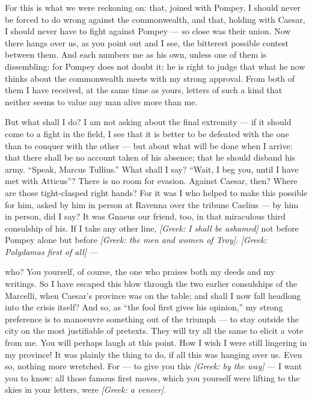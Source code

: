  For this is what we were reckoning on: that, joined with Pompey, I should never be forced to do wrong against the commonwealth, and that, holding with Caesar, I should never have to fight against Pompey --- so close was their union. Now there hangs over us, as you point out and I see, the bitterest possible contest between them. And each numbers me as his own, unless one of them is dissembling: for Pompey does not doubt it; he is right to judge that what he now thinks about the commonwealth meets with my strong approval. From both of them I have received, at the same time as yours, letters of such a kind that neither seems to value any man alive more than me.

 But what shall I do? I am not asking about the final extremity --- if it should come to a fight in the field, I see that it is better to be defeated with the one than to conquer with the other --- but about what will be done when I arrive: that there shall be no account taken of his absence; that he should disband his army. ``Speak, Marcus Tullius.'' What shall I say? ``Wait, I beg you, until I have met with Atticus''? There is no room for evasion. Against Caesar, then? Where are those tight-clasped right hands? For it was I who helped to make this possible for him, asked by him in person at Ravenna over the tribune Caelius --- by him in person, did I say? It was Gnaeus our friend, too, in that miraculous third consulship of his. If I take any other line, \textit{[Greek: I shall be ashamed]} not before Pompey alone but before \textit{[Greek: the men and women of Troy]}. \textit{[Greek: Polydamas first of all]} ---

 who? You yourself, of course, the one who praises both my deeds and my writings. So I have escaped this blow through the two earlier consulships of the Marcelli, when Caesar's province was on the table; and shall I now fall headlong into the crisis itself? And so, as ``the fool first gives his opinion,'' my strong preference is to manoeuvre something out of the triumph --- to stay outside the city on the most justifiable of pretexts. They will try all the same to elicit a vote from me. You will perhaps laugh at this point. How I wish I were still lingering in my province! It was plainly the thing to do, if all this was hanging over us. Even so, nothing more wretched. For --- to give you this \textit{[Greek: by the way]} --- I want you to know: all those famous first moves, which you yourself were lifting to the skies in your letters, were \textit{[Greek: a veneer]}.

